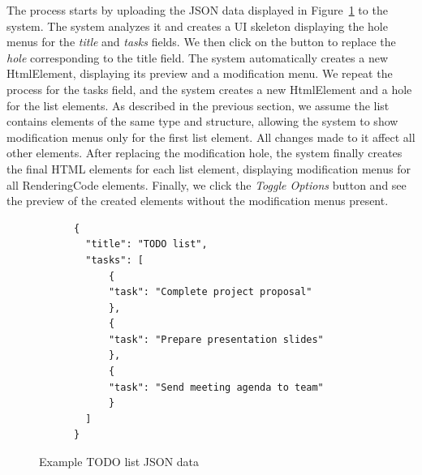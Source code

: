 The process starts by uploading the JSON data displayed in Figure~\ref{fig:simple-todo-json} to the system.
The system analyzes it and creates a UI skeleton displaying the hole menus for the \emph{title} and \emph{tasks} fields.
We then click on the button to replace the \emph{hole} corresponding to the title field. The system automatically creates a new HtmlElement, displaying its preview and a modification menu.
We repeat the process for the tasks field, and the system creates a new HtmlElement and a hole for the list elements.
As described in the previous section, we assume the list contains elements of the same type and structure, allowing the system to show modification menus only for the first list element. All changes made to it affect all other elements.
After replacing the modification hole, the system finally creates the final HTML elements for each list element, displaying modification menus for all RenderingCode elements.
Finally, we click the \emph{Toggle Options} button and see the preview of the created elements without the modification menus present.

\begin{figure}[H]
	\centering
	\begin{lstlisting} 
      {
        "title": "TODO list",
        "tasks": [
            {
            "task": "Complete project proposal"
            },
            {
            "task": "Prepare presentation slides"
            },
            {
            "task": "Send meeting agenda to team"
            }
        ]
      }
    \end{lstlisting}
	\caption{Example TODO list JSON data}
	\label{fig:simple-todo-json}
\end{figure}


